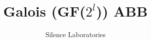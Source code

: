 \documentclass{article}
\begin{document}
\title{Galois (GF($2^l$)) ABB}
\author{Silence Laboratories}
\maketitle





\end{document}
